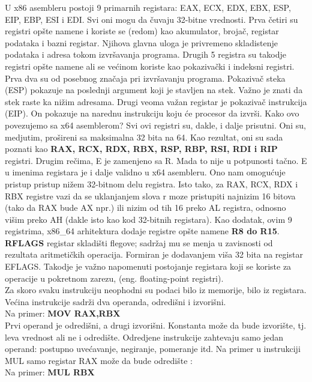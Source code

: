\documentclass[a4paper]{article}
\begin{document}
U x86 asembleru postoji 9 primarnih registara: EAX, ECX, EDX, EBX, ESP, EIP, EBP, ESI i EDI. Svi oni mogu da \v cuvaju 32-bitne 
vrednosti. Prva \v cetiri su registri op\v ste namene i koriste se (redom) kao akumulator, broja\v c, registar podataka i 
bazni registar. Njihova glavna uloga je privremeno skladistenje podataka i adresa tokom izvr\v savanja programa.
Drugih 5 registra su takodje registri op\v ste namene ali se ve\' cinom koriste kao pokaziva\v cki i indeksni registri.
Prva dva su od posebnog zna\v caja pri izvr\v savanju programa. Pokaziva\v c steka (ESP) pokazuje na poslednji argument 
koji je stavljen na stek. Va\v zno je znati da stek raste ka ni\v zim adresama. Drugi veoma va\v zan registar je
pokaziva\v c instrukcija (EIP). On pokazuje na narednu instrukciju koju \' ce procesor da izvr\v si. Kako ovo povezujemo sa 
x64 asemblerom? Svi ovi registri su, dakle, i dalje prisutni. Oni su, medjutim, pro\v sireni sa maksimalna 32 bita na 64.
Kao rezultat, oni su sada poznati kao \textbf{RAX, RCX, RDX, RBX, RSP, RBP, RSI, RDI i RIP} registri. Drugim re\v cima, 
E je zamenjeno sa R. Mada to nije u potpunosti ta\v cno. E u imenima registara je i dalje validno u x64 asembleru.
Ono nam omogu\' cuje pristup pristup ni\v zem 32-bitnom delu registra. Isto tako, za RAX, RCX, RDX i RBX registre vazi da
se uklanjanjem slova r moze pristupiti najnizim 16 bitova (tako da RAX bude AX npr.) ili nizim od tih 16 preko AL registra, 
odnosno vi\v sim preko AH (dakle isto kao kod 32-bitnih registara). Kao dodatak, ovim 9 registrima, x86\_64 arhitektura dodaje
registre op\v ste namene \textbf{R8 do R15}. \textbf{RFLAGS} registar skladi\v sti flegove; sadr\v zaj mu se menja u zavisnosti od rezultata 
aritmeti\v ckih operacija. Formiran je dodavanjem vi\v sa 32 bita na registar EFLAGS. Takodje je va\v zno napomenuti 
postojanje registara koji se koriste za operacije u pokretnom zarezu, (eng. floating-point registri). \\
Za skoro svaku instrukciju neophodni su podaci bilo iz memorije, bilo iz registara.
Ve\' cina instrukcije sadr\v zi dva operanda, odredi\v sni i izvori\v sni.\\
Na primer: \textbf{MOV RAX,RBX} \\
Prvi operand je odredi\v sni, a drugi izvori\v sni. Konstanta mo\v ze da bude izvori\v ste, tj. leva vrednost 
ali ne i odredi\v ste. Odredjene instrukcije zahtevaju samo jedan operand: postupno uve\' cavanje, negiranje, pomeranje itd. 
Na primer u instrukciji MUL samo registar RAX mo\v ze da bude odredi\v ste \cite{Introduction}: \\
Na primer: \textbf {MUL RBX} \\
\end{document}

